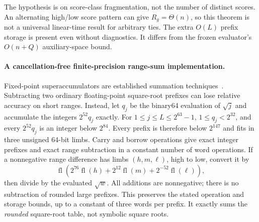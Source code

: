 The hypothesis is on score-class fragmentation, not the number of distinct
scores. An alternating high/low score pattern can give $R_g=\Theta(n)$,
so this theorem is not a universal linear-time result for arbitrary ties.
The extra $O(L)$ prefix storage is present even without diagnostics. It
differs from the frozen evaluator's $O(n+Q)$ auxiliary-space bound.

\paragraph{A cancellation-free finite-precision range-sum implementation.}
Fixed-point superaccumulators are established summation techniques~\cite{neal2015}.
Subtracting two ordinary floating-point square-root prefixes can lose
relative accuracy on short ranges. Instead, let $q_j$ be the binary64
evaluation of $\sqrt j$ and accumulate the integers $2^{52}q_j$ exactly.
For $1\le j\le L\le2^{63}-1$, $1\le q_j<2^{32}$, and every
$2^{52}q_j$ is an integer below $2^{84}$. Every prefix is therefore below
$2^{147}$ and fits in three unsigned 64-bit limbs. Carry and borrow
operations give exact integer prefixes and exact range subtraction in a
constant number of word operations. If a nonnegative range difference
has limbs $(h,m,\ell)$, high to low, convert it by
\[
 \operatorname{fl}\!\left(
   2^{76}\operatorname{fl}(h)
   +2^{12}\operatorname{fl}(m)
   +2^{-52}\operatorname{fl}(\ell)\right),
\]
then divide by the evaluated $\sqrt w$. All additions are nonnegative;
there is no subtraction of rounded large prefixes. This preserves the
stated operation and storage bounds, up to a constant of three words per
prefix. It exactly sums the \emph{rounded} square-root table, not symbolic
square roots.

